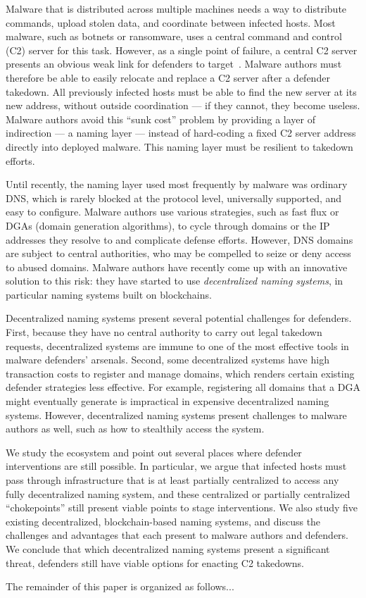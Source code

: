 Malware that is distributed across multiple machines needs a way to distribute 
commands, upload stolen 
data, and coordinate between infected hosts. Most malware, such as botnets or 
ransomware, uses a 
central command and control (C2) server for this task. However, as a single 
point of failure, a 
central C2 server presents an obvious weak link for defenders to 
target~\cite{kesari_deterring_2017}. 
Malware authors must therefore be able to easily relocate and replace a C2 
server after a defender 
takedown. All previously infected hosts must be able to find the new server at 
its new address, 
without outside coordination --- if they cannot, they become useless. Malware 
authors avoid 
this ``sunk cost'' problem by providing a layer of indirection --- a naming 
layer --- instead of 
hard-coding a fixed C2 server address directly into deployed malware. This 
naming layer must be 
resilient to takedown efforts.

Until recently, the naming layer used most frequently by malware was ordinary 
DNS, which is rarely 
blocked at the protocol level, universally supported, and easy to configure. 
Malware authors use 
various strategies, such as fast flux or DGAs (domain generation algorithms), 
to cycle through domains 
or the IP addresses they resolve to and complicate defense efforts. However, 
DNS domains are subject 
to central authorities, who may be compelled to seize or deny access to abused 
domains. Malware 
authors have recently come up with an innovative solution to this risk: they 
have started to use 
\emph{decentralized naming systems}, in particular naming systems built on 
blockchains. 

Decentralized naming systems present several potential challenges for 
defenders. First, because they 
have no central authority to carry out legal takedown requests, decentralized 
systems are immune to 
one of the most effective tools in malware defenders' arsenals. Second, some 
decentralized systems 
have high transaction costs to register and manage domains, which renders 
certain existing defender 
strategies less effective. For example, registering all domains that a DGA 
might eventually generate 
is impractical in expensive decentralized naming systems. However, 
decentralized naming systems 
present challenges to malware authors as well, such as how to stealthily access 
the system.

We study the ecosystem and point out several places where defender 
interventions are still possible. 
In particular, we argue that infected hosts must pass through infrastructure 
that is at least 
partially centralized to access any fully decentralized naming system, and 
these centralized or 
partially centralized ``chokepoints'' still present viable points to stage 
interventions. We also 
study five existing decentralized, blockchain-based naming systems, and discuss 
the challenges and 
advantages that each present to malware authors and defenders. We conclude that 
which decentralized 
naming systems present a significant threat, defenders still have viable 
options for enacting C2 
takedowns.

The remainder of this paper is organized as follows...